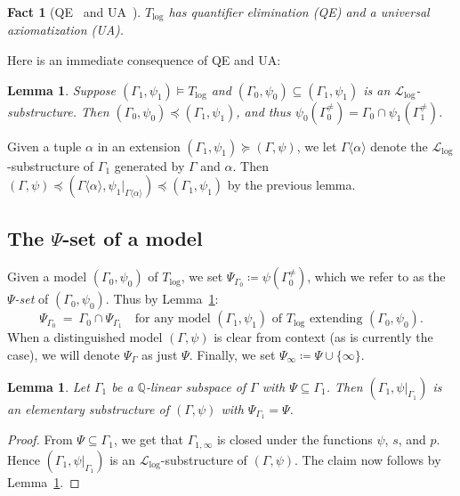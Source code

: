 \documentclass[11pt]{amsart}
\theoremstyle{plain}
\newtheorem{lemma}[thm]{Lemma}
\newtheorem{fact}[thm]{Fact}
\theoremstyle{definition}
\numberwithin{equation}{section}
\newcommand\Q{\mathbb{Q}}
\newcommand\calL{\mathcal{L}}
\newcommand\0{\varnothing}
\begin{document}
\begin{fact}[{QE~\cite[Theorem~5.2]{GehretACTlog} and UA~\cite[Lemma~5.1]{GehretACTlog}}]
$T_{\log}$ has quantifier elimination (QE) and a universal axiomatization (UA).
\end{fact}

\noindent
Here is an immediate consequence of QE and UA:

\begin{lemma}\label{easy_consequences_QE_UA}
Suppose $(\Gamma_1,\psi_1)\models T_{\log}$ and $(\Gamma_0,\psi_0)\subseteq(\Gamma_1,\psi_1)$ is an $\calL_{\log}$-substructure. Then $(\Gamma_0,\psi_0)\preccurlyeq(\Gamma_1,\psi_1)$, 
and thus $\psi_0(\Gamma_0^{\neq})=\Gamma_0\cap\psi_1(\Gamma^{\neq}_1)$.
\end{lemma}

\noindent
Given a tuple $\alpha$ in an extension $(\Gamma_1,\psi_1)\succcurlyeq (\Gamma,\psi)$, we let $\Gamma\langle \alpha\rangle$ denote the $\calL_{\log}$-substructure of $\Gamma_1$ generated by $\Gamma$ and $\alpha$. Then $(\Gamma,\psi)\preccurlyeq (\Gamma\langle \alpha\rangle,\psi_1|_{\Gamma\langle \alpha\rangle})\preccurlyeq (\Gamma_1,\psi_1)$ by the previous lemma. 


\subsection{The \texorpdfstring{$\Psi$}{Ψ}-set of a model}
Given a model $(\Gamma_0,\psi_0)$ of $T_{\log}$, we set $\Psi_{\Gamma_0}\coloneqq\psi(\Gamma^{\neq}_0)$, which we refer to as the \emph{$\Psi$-set} of $(\Gamma_0,\psi_0)$. Thus by Lemma~\ref{easy_consequences_QE_UA}:
\[
\Psi_{\Gamma_0} \ = \ \Gamma_0\cap\Psi_{\Gamma_1} \quad \text{for any model $(\Gamma_1,\psi_1)$ of $T_{\log}$ extending $(\Gamma_0,\psi_0)$}.
\]
When a distinguished model $(\Gamma,\psi)$ is clear from context (as is currently the case), we will denote $\Psi_{\Gamma}$ as just $\Psi$. Finally, we set $\Psi_{\infty}\coloneqq\Psi\cup\{\infty\}$. 
\begin{lemma}\label{lem_elemsub}
Let $\Gamma_1$ be a $\Q$-linear subspace of $\Gamma$ with $\Psi\subseteq\Gamma_1$.
Then $(\Gamma_1,\psi|_{\Gamma_1})$ is an elementary substructure of $(\Gamma,\psi)$ with $\Psi_{\Gamma_1}=\Psi$.
\end{lemma}
\begin{proof}
From $\Psi\subseteq\Gamma_1$, we get that $\Gamma_{1,\infty}$ is closed under the functions $\psi$, $s$, and $p$.
Hence $(\Gamma_1,\psi|_{\Gamma_1})$ is an $\calL_{\log}$-substructure of $(\Gamma,\psi)$. The claim now follows by Lemma~\ref{easy_consequences_QE_UA}.
\end{proof}
\end{document}

